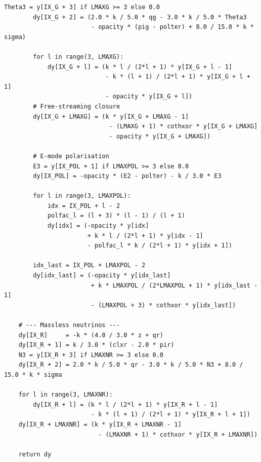 \begin{codebox}
\begin{lstlisting}[style=python]
        Theta3 = y[IX_G + 3] if LMAXG >= 3 else 0.0
        dy[IX_G + 2] = (2.0 * k / 5.0 * qg - 3.0 * k / 5.0 * Theta3
                        - opacity * (pig - polter) + 8.0 / 15.0 * k * sigma)

        for l in range(3, LMAXG):
            dy[IX_G + l] = (k * l / (2*l + 1) * y[IX_G + l - 1]
                            - k * (l + 1) / (2*l + 1) * y[IX_G + l + 1]
                            - opacity * y[IX_G + l])
        # Free-streaming closure
        dy[IX_G + LMAXG] = (k * y[IX_G + LMAXG - 1]
                             - (LMAXG + 1) * cothxor * y[IX_G + LMAXG]
                             - opacity * y[IX_G + LMAXG])

        # E-mode polarisation
        E3 = y[IX_POL + 1] if LMAXPOL >= 3 else 0.0
        dy[IX_POL] = -opacity * (E2 - polter) - k / 3.0 * E3

        for l in range(3, LMAXPOL):
            idx = IX_POL + l - 2
            polfac_l = (l + 3) * (l - 1) / (l + 1)
            dy[idx] = (-opacity * y[idx]
                       + k * l / (2*l + 1) * y[idx - 1]
                       - polfac_l * k / (2*l + 1) * y[idx + 1])

        idx_last = IX_POL + LMAXPOL - 2
        dy[idx_last] = (-opacity * y[idx_last]
                        + k * LMAXPOL / (2*LMAXPOL + 1) * y[idx_last - 1]
                        - (LMAXPOL + 3) * cothxor * y[idx_last])

    # --- Massless neutrinos ---
    dy[IX_R]     = -k * (4.0 / 3.0 * z + qr)
    dy[IX_R + 1] = k / 3.0 * (clxr - 2.0 * pir)
    N3 = y[IX_R + 3] if LMAXNR >= 3 else 0.0
    dy[IX_R + 2] = 2.0 * k / 5.0 * qr - 3.0 * k / 5.0 * N3 + 8.0 / 15.0 * k * sigma

    for l in range(3, LMAXNR):
        dy[IX_R + l] = (k * l / (2*l + 1) * y[IX_R + l - 1]
                        - k * (l + 1) / (2*l + 1) * y[IX_R + l + 1])
    dy[IX_R + LMAXNR] = (k * y[IX_R + LMAXNR - 1]
                          - (LMAXNR + 1) * cothxor * y[IX_R + LMAXNR])

    return dy
\end{lstlisting}
\end{codebox}

